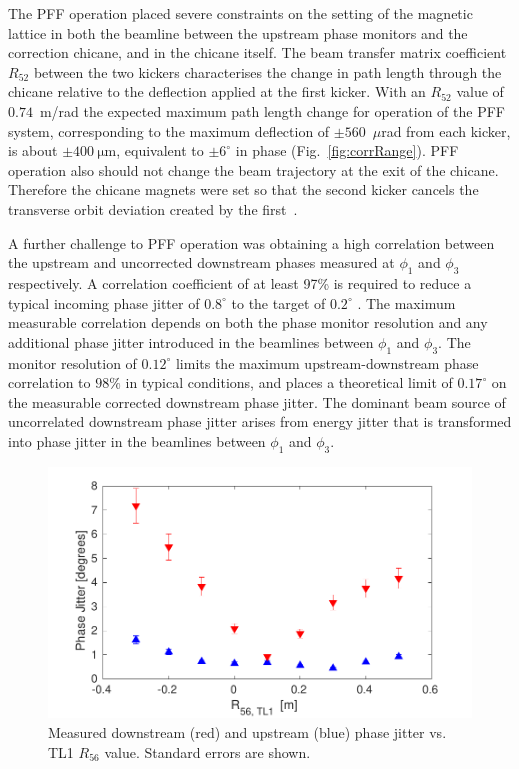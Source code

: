 \documentclass[%
 reprint,
 superscriptaddress,
 amsmath,
 amssymb,
 prl,
]{revtex4-1}
\begin{document}
The PFF operation placed severe constraints on the setting of the 
magnetic lattice in both the beamline between the upstream phase monitors and 
the correction chicane, and in  the chicane itself.
The beam transfer matrix coefficient \(R_{52}\) between the two kickers 
characterises the change in path length through the chicane relative to the 
deflection applied at the first kicker. 
With an \(R_{52}\) value of \(0.74\)~m/rad \cite{RobertsThesis} the expected 
maximum path length change for operation of the PFF system, corresponding to 
the maximum deflection of \(\pm560\)~\(\mu\)rad from each kicker, is about 
\(\pm400~\mathrm{\mu m}\), equivalent to \(\pm6^\circ\) in phase 
(Fig.~\ref{fig:corrRange}). PFF operation also should not change the beam 
trajectory at the exit of the chicane. Therefore the chicane magnets were set 
so that the second kicker cancels the transverse orbit deviation created by the 
first~\cite{RobertsThesis}.

A further challenge to PFF operation was obtaining a high correlation 
between the upstream and uncorrected downstream phases measured at \(\phi_1\) 
and \(\phi_3\) respectively. 
A correlation coefficient of at least 97\% is required to reduce a typical 
incoming phase jitter of \(0.8^\circ\) to the target of \(0.2^\circ\) 
\cite{RobertsThesis}. 
The maximum measurable correlation depends on both the phase monitor resolution 
and any additional phase jitter introduced in the beamlines between \(\phi_1\) 
and \(\phi_3\). The monitor resolution of \(0.12^\circ\) limits the maximum 
upstream-downstream phase correlation to \(98\%\) in typical conditions, and 
places a theoretical limit of \(0.17^\circ\) on the measurable corrected 
downstream phase jitter. 
The dominant beam source of uncorrelated downstream phase jitter 
arises from energy jitter that is transformed into phase jitter in the 
beamlines between \(\phi_1\) and \(\phi_3\). 

\begin{figure}
	\includegraphics[width=\columnwidth]{figs/r56Scan}
	\caption{\label{fig:r56Scan}Measured downstream (red) and upstream (blue) 
	phase jitter vs. TL1 \(R_{56}\) value. Standard errors are shown.
		}
\end{figure}
\end{document}
